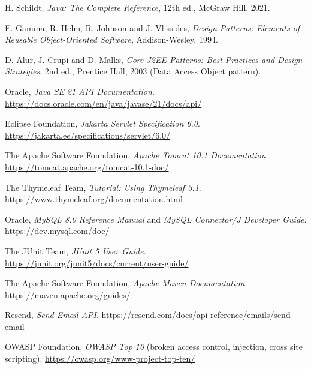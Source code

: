 \documentclass[12pt,a4paper]{report}
\begin{document}
\begin{enumerate}[label={[\arabic*]}]
  \item H. Schildt, \textit{Java: The Complete Reference}, 12th ed., McGraw Hill, 2021.
  \item E. Gamma, R. Helm, R. Johnson and J. Vlissides, \textit{Design Patterns: Elements of Reusable Object-Oriented Software}, Addison-Wesley, 1994.
  \item D. Alur, J. Crupi and D. Malks, \textit{Core J2EE Patterns: Best Practices and Design Strategies}, 2nd ed., Prentice Hall, 2003 (Data Access Object pattern).
  \item Oracle, \textit{Java SE 21 API Documentation}. \url{https://docs.oracle.com/en/java/javase/21/docs/api/}
  \item Eclipse Foundation, \textit{Jakarta Servlet Specification 6.0}. \url{https://jakarta.ee/specifications/servlet/6.0/}
  \item The Apache Software Foundation, \textit{Apache Tomcat 10.1 Documentation}. \url{https://tomcat.apache.org/tomcat-10.1-doc/}
  \item The Thymeleaf Team, \textit{Tutorial: Using Thymeleaf 3.1}. \url{https://www.thymeleaf.org/documentation.html}
  \item Oracle, \textit{MySQL 8.0 Reference Manual} and \textit{MySQL Connector/J Developer Guide}. \url{https://dev.mysql.com/doc/}
  \item The JUnit Team, \textit{JUnit 5 User Guide}. \url{https://junit.org/junit5/docs/current/user-guide/}
  \item The Apache Software Foundation, \textit{Apache Maven Documentation}. \url{https://maven.apache.org/guides/}
  \item Resend, \textit{Send Email API}. \url{https://resend.com/docs/api-reference/emails/send-email}
  \item OWASP Foundation, \textit{OWASP Top 10} (broken access control, injection, cross site scripting). \url{https://owasp.org/www-project-top-ten/}
\end{enumerate}
\end{document}
